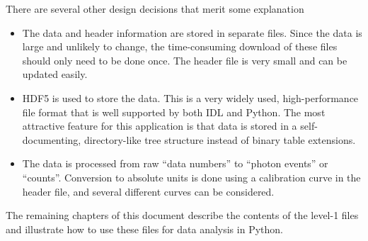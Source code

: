 There are several other design decisions that merit some explanation

\begin{itemize}
  \item The data and header information are stored in separate files. Since the data is large and
    unlikely to change, the time-consuming download of these files should only need to be done
    once. The header file is very small and can be updated easily.
  \item HDF5 is used to store the data. This is a very widely used, high-performance file format
    that is well supported by both IDL and Python. The most attractive feature for this application
    is that data is stored in a self-documenting, directory-like tree structure instead of binary
    table extensions.
  \item The data is processed from raw ``data numbers'' to ``photon events'' or
    ``counts''. Conversion to absolute units is done using a calibration curve in the header
    file, and several different curves can be considered.
\end{itemize}

The remaining chapters of this document describe the contents of the level-1 files and illustrate
how to use these files for data analysis in Python.



